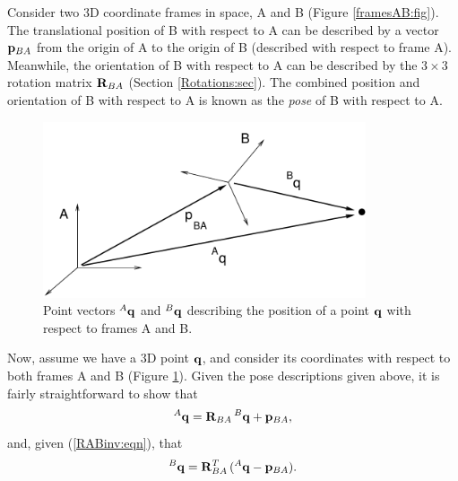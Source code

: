 Consider two 3D coordinate frames in space, A and B (Figure
\ref{framesAB:fig}). The translational position of B with respect to A
can be described by a vector ${\bf p}_{BA}$ from the origin of A to the
origin of B (described with respect to frame A). Meanwhile, the
orientation of B with respect to A can be described by the $3 \times
3$ rotation matrix ${\bf R}_{BA}$ (Section \ref{Rotations:sec}).  The
combined position and orientation of B with respect to A is known as
the {\it pose} of B with respect to A.

\begin{figure}[t]
\begin{center}
 \includegraphics[width=3.75in]{images/pointsAB}
\end{center}
\caption{Point vectors ${}^A{\bf q}$ and ${}^B{\bf q}$ describing
the position of a point ${\bf q}$ with respect to frames A and B.}
\label{pointsAB:fig}
\end{figure}

Now, assume we have a 3D point ${\bf q}$, and consider its coordinates with
respect to both frames A and B (Figure \ref{pointsAB:fig}). Given the
pose descriptions given above, it is fairly straightforward to show
that
%
\begin{equation}
{}^A{\bf q} = {\bf R}_{BA} \, {}^B{\bf q} + {\bf p}_{BA},
\label{pointTransform:eqn}
\end{equation}
%
and, given (\ref{RABinv:eqn}), that
%
\begin{equation}
{}^B{\bf q} = {\bf R}_{BA}^T \, ({}^A{\bf q} - {\bf p}_{BA}).
\label{pointInvTransform:eqn}
\end{equation}
%

